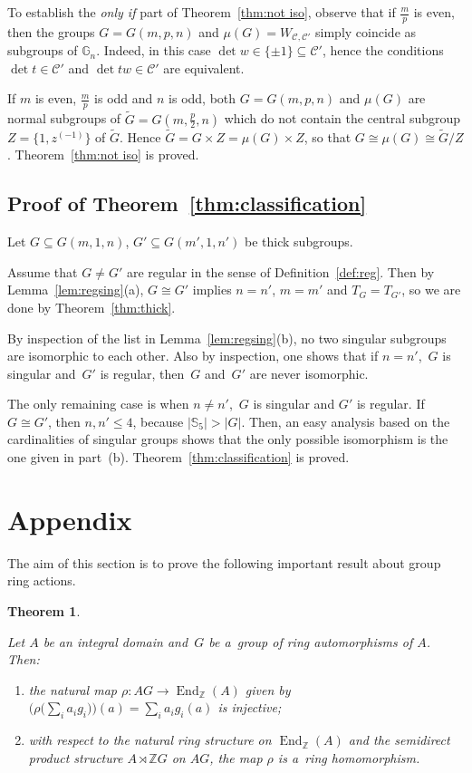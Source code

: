 \documentclass[pdftex]{sigma}
\DeclareMathOperator{\End}{End}
\newtheorem{Theorem}{Theorem}[section]
\begin{document}
To establish the \textit{only if} part of Theorem~\ref{thm:not iso}, observe that if $\frac mp$ is even, then the groups
$G=G(m,p,n)$ and $\mu(G)=W_{{\mathcal C},{\mathcal C}'}$ simply coincide as subgroups of $\mathbb G_n$.
Indeed, in this case $\det w\in \{\pm1\}\subseteq {\mathcal C}'$, hence the conditions $\det t\in {\mathcal C}'$ and
$\det tw\in {\mathcal C}'$ are equivalent.

If $m$ is even, $\frac mp$ is odd and $n$ is odd, both $G=G(m,p,n)$ and $\mu(G)$ are normal subgroups of $\widetilde
G=G(m,\frac p2,n)$ which do not contain the central subgroup $Z=\big\{1,z^{(-1)}\big\}$ of $\widetilde G$.
Hence $\widetilde G = G\times Z = \mu(G)\times Z$, so that $G\cong\mu(G)\cong \widetilde G / Z$.
Theorem~\ref{thm:not iso} is proved.



\subsection*{Proof of Theorem~\ref{thm:classification}}

Let $G\subseteq G(m,1,n)$, $G'\subseteq G(m',1,n')$ be thick subgroups.

Assume that $G\ne G'$ are regular in the sense of Def\/inition~\ref{def:reg}.
Then by Lemma~\ref{lem:regsing}(a), $G\cong G'$ implies $n=n'$, $m=m'$ and $T_G=T_{G'}$, so we are done by
Theorem~\ref{thm:thick}.

By inspection of the list in Lemma~\ref{lem:regsing}(b), no two singular subgroups are isomorphic to each other.
Also by inspection, one shows that if $n=n'$,~$G$ is singular and~$G'$ is regular, then~$G$ and~$G'$ are never
isomorphic.

The only remaining case is when $n\ne n'$,~$G$ is singular and $G'$ is regular.
If $G\cong G'$, then $n,n'\le 4$, because $|\mathbb S_5|>|G|$.
Then, an easy analysis based on the cardinalities of singular groups shows that the only possible isomorphism is the one
given in part~(b).
Theorem~\ref{thm:classification} is proved.



\section{Appendix}

The aim of this section is to prove the following important result about group ring actions.

\begin{Theorem}
\label{thm:Premet}

Let $A$ be an integral domain and~$G$ be a~group of ring automorphisms of $A$.
Then:
\begin{enumerate}\itemsep=0pt
\item[$(a)$] the natural map $\rho\colon AG \to \End_\mathbb Z(A)$ given by $\big(\rho\big(\sum\limits_i a_i g_i\big)\big)(a)=\sum\limits_i a_i g_i(a)$ is injective;
\item[$(b)$] with respect to the natural ring structure on $\End_\mathbb Z(A)$ and the semidirect product structure $A\rtimes
\mathbb Z G$ on $AG$, the map $\rho$ is a~ring homomorphism.
\end{enumerate}
\end{Theorem}
\end{document}
